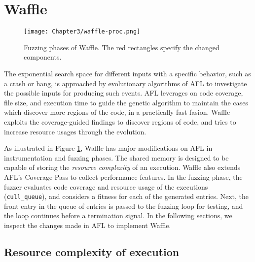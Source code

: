 \section{Waffle}
\label{sec:3-instr}



\begin{figure}[!t]
  \texttt{[image: Chapter3/waffle-proc.png]}
  \centering
  \caption{Fuzzing phases of Waffle. The red rectangles specify the changed components.}
  \label{fig:waffle-phases}
\end{figure}

The exponential search space for different inputs with a specific behavior, such as a crash or hang, is approached by evolutionary algorithms of AFL to investigate the possible inputs for producing such events. AFL leverages on code coverage, file size, and execution time to guide the genetic algorithm to maintain the cases which discover more regions of the code, in a practically fast fasion. Waffle exploits the coverage-guided findings to discover regions of code, and tries to increase resource usages through the evolution.


As illustrated in Figure \ref{fig:waffle-phases}, Waffle has major modifications on AFL in instrumentation and fuzzing phases. The shared memory is designed to be capable of storing the \textit{resource complexity} of an execution. Waffle also extends AFL's Coverage Pass to collect performance features. In the fuzzing phase, the fuzzer evaluates code coverage and resource usage of the executions (\texttt{cull\_queue}), and considers a fitness for each of the generated entries. Next, the front entry in the queue of entries is passed to the fuzzing loop for testing, and the loop continues before a termination signal. In the following sections, we inspect the changes made in AFL to implement Waffle.

\subsection{Resource complexity of execution}

